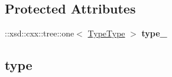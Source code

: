 \subsection*{Protected Attributes}
\begin{DoxyCompactItemize}
\item 
\hypertarget{classopenstack_1_1xml_1_1Reboot_af85ccc7d7adec5feea7f47b7361b1fe5}{
::xsd::cxx::tree::one$<$ \hyperlink{classopenstack_1_1xml_1_1RebootType}{TypeType} $>$ {\bfseries type\_\-}}
\label{classopenstack_1_1xml_1_1Reboot_af85ccc7d7adec5feea7f47b7361b1fe5}

\end{DoxyCompactItemize}
\subsection*{type}
\label{_amgrp599dcce2998a6b40b1e38e8c6006cb0a}
